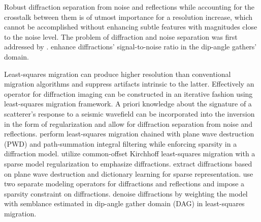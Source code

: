 Robust diffraction separation from noise and reflections while accounting for the crosstalk between them is of utmost importance for a resolution increase, which cannot be accomplished without
enhancing subtle features with magnitudes close to the noise level. The problem of diffraction and noise separation
was first addressed by \cite{harlan84}.
\cite{klokov2010separation,klokov10b,klokov2012diffraction,burnett15}
enhance diffractions' signal-to-noise ratio
in the dip-angle gathers' domain. 

Least-squares migration \cite[]{Nemeth99,ronen2000least} can produce higher resolution than conventional migration
algorithms and suppress artifacts intrinsic to the latter. Effectively an operator for diffraction imaging 
can be constructed in an iterative fashion using least-squares migration framework. A priori knowledge about the signature
of a scatterer's response to a seismic wavefield can be incorporated into the inversion in the form of regularization and allow
for diffraction separation from noise and reflections. \cite{merzlikin2016least} perform least-squares migration chained with
plane wave destruction (PWD) \cite[]{fomel02,fomel07} and path-summation integral filtering while enforcing sparsity
in a diffraction model. \cite{yu2016sparse} utilize common-offset Kirchhoff least-squares migration with a sparse model regularization to emphasize diffractions.
\cite{yu2017seismic} extract diffractions based on plane wave destruction and dictionary learning for sparse representation.
\cite{yu2016separation} use two separate modeling operators for diffractions and reflections and impose a sparsity constraint on diffractions.
\cite{decker2017enhancing} denoise diffractions by weighting the model with semblance estimated
in dip-angle gather domain (DAG) in least-squares migration.

